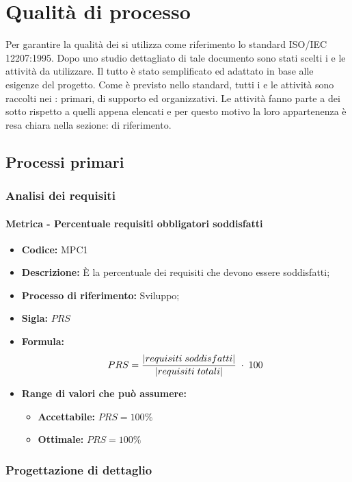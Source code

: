 \section{Qualità di processo}
Per garantire la qualità dei  si utilizza come riferimento lo standard ISO/IEC 12207:1995. Dopo uno studio dettagliato di tale documento sono stati scelti i 
e le attività da utilizzare. Il tutto è stato semplificato ed adattato in base alle esigenze del progetto. Come è previsto nello standard, tutti i  e le attività sono raccolti 
nei : primari, di supporto ed organizzativi. Le attività fanno parte a dei sotto  rispetto a quelli appena elencati e per questo motivo la loro 
appartenenza è resa chiara nella sezione:  di riferimento.

\subsection{Processi primari}

\subsubsection{Analisi dei requisiti}
    \paragraph{Metrica - Percentuale requisiti obbligatori soddisfatti}
    \begin{itemize}
        \item \textbf{Codice:} MPC1
        \item \textbf{Descrizione:} È la percentuale dei requisiti che devono essere soddisfatti;
        \item \textbf{Processo di riferimento:} Sviluppo;
        \item \textbf{Sigla:} $PRS$
        \item \textbf{Formula:} $$PRS = {|requisiti \; soddisfatti| \over |requisiti \; totali|}\; \cdot \; 100$$
        \item \textbf{Range di valori che può assumere:}
        \begin{itemize}
            \item \textbf{Accettabile:} $PRS = 100\%$
            \item \textbf{Ottimale:} $PRS = 100\%$
        \end{itemize}
    \end{itemize} 
\subsubsection{Progettazione di dettaglio}

